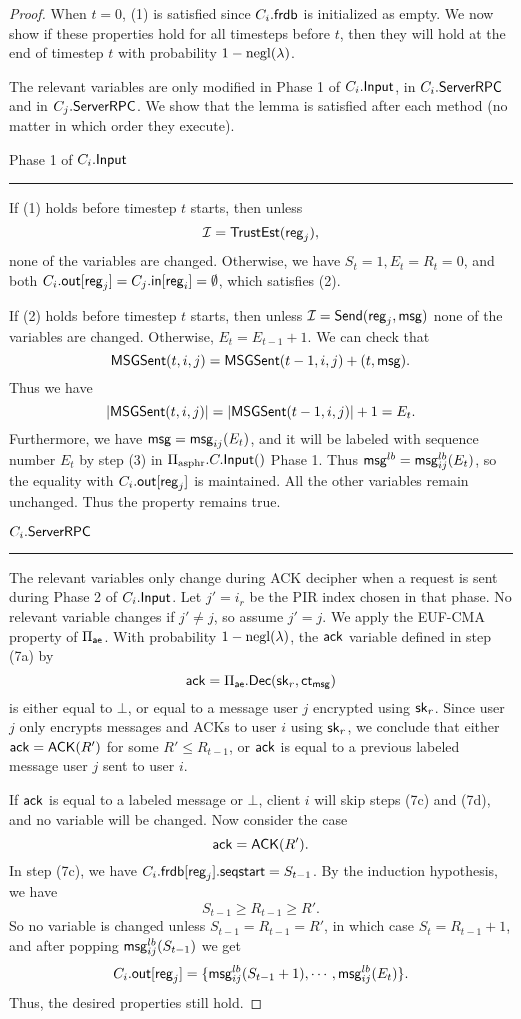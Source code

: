 \begin{proof}
When $t = 0$, (1) is satisfied since $C_i.\mathsf{frdb}$ is initialized as empty. We now show if these properties hold for all timesteps before $t$, then they will hold at the end of timestep $t$ with probability $1 - \operatorname{negl}(\lambda)$.

The relevant variables are only modified in Phase 1 of $C_i.\mathsf{Input}$, in $C_i.\mathsf{ServerRPC}$ and in $C_j.\mathsf{ServerRPC}$. We show that the lemma is satisfied after each method (no matter in which order they execute).

Phase 1 of $C_i.\mathsf{Input}$
\hrule
If (1) holds before timestep $t$ starts, then unless 
$$\mathcal{I} = \mathsf{TrustEst}(\mathsf{reg}_j),$$
none of the variables are changed. Otherwise, we have $S_t = 1, E_t = R_t = 0$, and both $C_i.\mathsf{out}[\mathsf{reg}_j] = C_j.\mathsf{in}[\mathsf{reg}_i] = \emptyset$, which satisfies (2).

If (2) holds before timestep $t$ starts, then unless $\mathcal{I} = \mathsf{Send}(\mathsf{reg}_j, \mathsf{msg})$ none of the variables are changed. Otherwise, $E_t = E_{t - 1} + 1$. We can check that
$$\mathsf{MSGSent}(t, i, j) = \mathsf{MSGSent}(t - 1, i, j) + (t, \mathsf{msg}).$$
Thus we have
$$\left| \mathsf{MSGSent}(t, i, j) \right| = \left| \mathsf{MSGSent}(t - 1, i, j) \right| + 1 = E_t.$$
Furthermore, we have $\mathsf{msg} = \mathsf{msg}_{ij}(E_t)$, and it will be labeled with sequence number $E_t$ by step (3) in $\Pi_{\text{asphr}}.C.\mathsf{Input}()$ Phase 1. Thus $\mathsf{msg}^{lb} = \mathsf{msg}^{lb}_{ij}(E_t)$, so the equality with $C_i.\mathsf{out}[\mathsf{reg}_j]$ is maintained. All the other variables remain unchanged. Thus the property remains true.

\vspace{10pt}
$C_i.\mathsf{ServerRPC}$
\hrule
The relevant variables only change during ACK decipher when a request is sent during Phase 2 of $C_i.\mathsf{Input}$. Let $j' = i_r$ be the PIR index chosen in that phase. No relevant variable changes if $j' \neq j$, so assume $j' = j$. We apply the EUF-CMA property of $\Pi_{\mathsf{ae}}$. With probability $1 - \operatorname{negl}(\lambda)$, the $\mathsf{ack}$ variable defined in step (7a) by
$$\mathsf{ack} = \Pi_{\mathsf{ae}}.\mathsf{Dec}({\mathsf{sk}}_r, \mathsf{ct}_{\mathsf{msg}})$$
is either equal to $\bot$, or equal to a message user $j$ encrypted using ${\mathsf{sk}}_r$. Since user $j$ only encrypts messages and ACKs to user $i$ using ${\mathsf{sk}}_r$, we conclude that either $\mathsf{ack} = \mathsf{ACK}(R')$ for some $R' \leq R_{t - 1}$, or $\mathsf{ack}$ is equal to a previous labeled message user $j$ sent to user $i$. 

If $\mathsf{ack}$ is equal to a labeled message or $\bot$, client $i$ will skip steps (7c) and (7d), and no variable will be changed. Now consider the case
$$\mathsf{ack} = \mathsf{ACK}(R').$$
In step (7c), we have $C_i.\mathsf{frdb}[\mathsf{reg}_j].\mathsf{seqstart} = S_{t - 1}$. By the induction hypothesis, we have
$$S_{t - 1} \geq R_{t - 1} \geq R'.$$
So no variable is changed unless $S_{t - 1} = R_{t - 1} = R'$, in which case $S_t = R_{t - 1} + 1$, and after popping $\mathsf{msg}^{lb}_{ij}(S_{t - 1})$ we get
$$C_i.\mathsf{out}[\mathsf{reg}_j] = \{\mathsf{msg}^{lb}_{ij}(S_{t - 1} + 1), \cdots, \mathsf{msg}^{lb}_{ij}(E_t)\}.$$
Thus, the desired properties still hold.


\end{proof}
